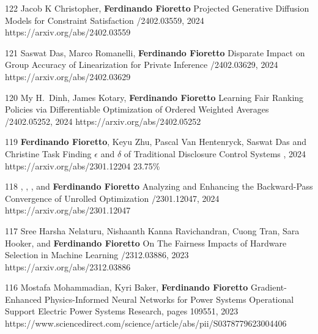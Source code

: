 \fi

\begin{pubs}

\wsentry
	{122}
	{\student{} Jacob K Christopher, {\bf Ferdinando Fioretto}}
  	{Projected Generative Diffusion Models for Constraint Satisfaction}
	{/2402.03559, 2024}
	{https://arxiv.org/abs/2402.03559}

\wsentry
	{121}
	{\student{} Saswat Das, Marco Romanelli, {\bf Ferdinando Fioretto}}
	{Disparate Impact on Group Accuracy of Linearization for Private Inference}
	{/2402.03629, 2024}
	{https://arxiv.org/abs/2402.03629}

\wsentry
	{120}
	{\student{} My H.~Dinh, \student{} James Kotary, {\bf Ferdinando Fioretto}}
	{Learning Fair Ranking Policies via Differentiable Optimization of Ordered Weighted Averages}
	{/2402.05252, 2024}
	{https://arxiv.org/abs/2402.05252}

\confentry
	{119}
	{{\bf Ferdinando Fioretto}, Keyu Zhu, Pascal Van Hentenryck, \student{} Saswat Das and Christine Task}
  	{Finding $\epsilon$ and $\delta$ of Traditional Disclosure Control Systems}
	{\procAAAI, 2024}
	{https://arxiv.org/abs/2301.12204}
	{23.75\%}

\wsentry
	{118}
	{, , ,
	and {\bf Ferdinando Fioretto}}
	{Analyzing and Enhancing the Backward-Pass Convergence of Unrolled Optimization}	
	{/2301.12047, 2024}
	{https://arxiv.org/abs/2301.12047}


\wsentry
	{117}
	{\student{} Sree Harsha Nelaturu, \student{} Nishaanth Kanna Ravichandran, \student{} Cuong Tran, Sara Hooker, and {\bf Ferdinando Fioretto}}
	{On The Fairness Impacts of Hardware Selection in Machine Learning}	
	{/2312.03886, 2023}
	{https://arxiv.org/abs/2312.03886}

\journalentry
	{116}
	{Mostafa Mohammadian, Kyri Baker, \textbf{Ferdinando Fioretto}}
	{Gradient-Enhanced Physics-Informed Neural Networks for Power Systems Operational Support}
	{Electric Power Systems Research, pages 109551, 2023}
	{https://www.sciencedirect.com/science/article/abs/pii/S0378779623004406}


\end{pubs}
